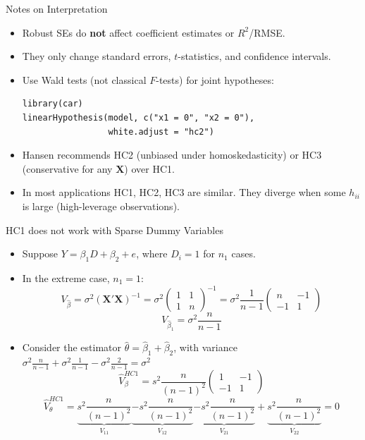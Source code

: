 \documentclass[aspectratio=169, handout, t]{beamer}
\numberwithin{equation}{section}
\begin{document}
\begin{frame}[fragile]{Notes on Interpretation}
\begin{itemize}
\item Robust SEs do \textbf{not} affect coefficient estimates or $R^2$/RMSE.
\item They only change standard errors, $t$-statistics, and confidence intervals. \pause
\item Use Wald tests (not classical $F$-tests) for joint hypotheses:
\begin{lstlisting}
library(car)
linearHypothesis(model, c("x1 = 0", "x2 = 0"),
                 white.adjust = "hc2")
\end{lstlisting}\pause
\item Hansen recommends HC2 (unbiased under homoskedasticity) or HC3 (conservative for any $\bm{X}$) over HC1.
\item In most applications HC1, HC2, HC3 are similar.  They diverge when some $h_{ii}$ is large (high-leverage observations).
\end{itemize}
\end{frame}


\begin{frame}{HC1 does not work with Sparse Dummy Variables}
\small
\begin{itemize}
\item Suppose $Y=\beta_1D+\beta_2+e$, where $D_i=1$ for $n_1$ cases.
\item In the extreme case, $n_1=1$:
$$V_{\hat{\beta}}=\sigma^2(\bm{X'X})^{-1}=\sigma^2\begin{pmatrix}1&1\\1&n\end{pmatrix}^{-1}=\sigma^2\frac{1}{n-1}\begin{pmatrix}n&-1\\-1&1\end{pmatrix}$$
$$V_{\hat{\beta}_1}=\sigma^2\frac{n}{n-1}$$
\item Consider the estimator $\hat{\theta}=\hat{\beta}_1+\hat{\beta}_2$, with variance $\sigma^2\frac{n}{n-1}+\sigma^2\frac{1}{n-1}-\sigma^2\frac{2}{n-1}=\sigma^2$
$$\hat{V}^{HC1}_\beta=s^2\frac{n}{(n-1)^2}\begin{pmatrix}1&-1\\-1&1\end{pmatrix}$$
$$\hat{V}^{HC1}_\theta=\underbrace{s^2\frac{n}{(n-1)^2}}_{V_{11}}\underbrace{-s^2\frac{n}{(n-1)^2}}_{V_{12}}\underbrace{-s^2\frac{n}{(n-1)^2}}_{V_{21}}+\underbrace{s^2\frac{n}{(n-1)^2}}_{V_{22}}=0$$
\end{itemize}
\end{frame}
\end{document}

